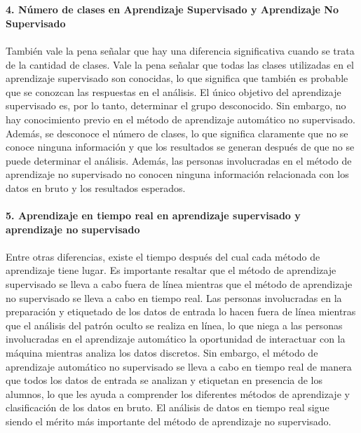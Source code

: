 \documentclass[%
 reprint,
 amsmath,amssymb,
 aps,
]{revtex4-1}
\begin{document}
{\textbf{}\\  
\textbf{}\\ 
\textbf{4. Número de clases en Aprendizaje Supervisado y Aprendizaje No Supervisado}\\   
\textbf{}\\ 
También vale la pena señalar que hay una diferencia significativa cuando se trata de la cantidad de clases. Vale la pena señalar que todas las clases utilizadas en el aprendizaje supervisado son conocidas, lo que significa que también es probable que se conozcan las respuestas en el análisis. El único objetivo del aprendizaje supervisado es, por lo tanto, determinar el grupo desconocido. Sin embargo, no hay conocimiento previo en el método de aprendizaje automático no supervisado. Además, se desconoce el número de clases, lo que significa claramente que no se conoce ninguna información y que los resultados se generan después de que no se puede determinar el análisis. Además, las personas involucradas en el método de aprendizaje no supervisado no conocen ninguna información relacionada con los datos en bruto y los resultados esperados.
\textbf{}\\  
\textbf{}\\ 
\textbf{5. Aprendizaje en tiempo real en aprendizaje supervisado y aprendizaje no supervisado}\\   
\textbf{}\\ 
Entre otras diferencias, existe el tiempo después del cual cada método de aprendizaje tiene lugar. Es importante resaltar que el método de aprendizaje supervisado se lleva a cabo fuera de línea mientras que el método de aprendizaje no supervisado se lleva a cabo en tiempo real. Las personas involucradas en la preparación y etiquetado de los datos de entrada lo hacen fuera de línea mientras que el análisis del patrón oculto se realiza en línea, lo que niega a las personas involucradas en el aprendizaje automático la oportunidad de interactuar con la máquina mientras analiza los datos discretos. Sin embargo, el método de aprendizaje automático no supervisado se lleva a cabo en tiempo real de manera que todos los datos de entrada se analizan y etiquetan en presencia de los alumnos, lo que les ayuda a comprender los diferentes métodos de aprendizaje y clasificación de los datos en bruto. El análisis de datos en tiempo real sigue siendo el mérito más importante del método de aprendizaje no supervisado.

}
\end{document}
